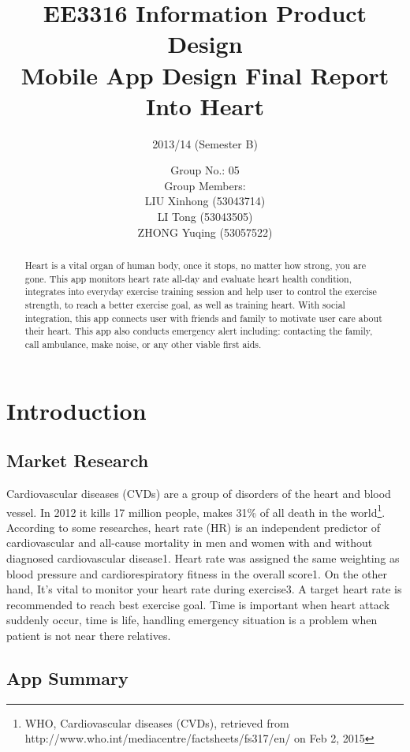 \documentclass[10pt,a4paper,final]{scrartcl}
\author{
Group No.: 05 \\ 
Group Members: \\
LIU Xinhong (53043714) \\
LI Tong (53043505) \\
ZHONG Yuqing (53057522)
}
\title{
EE3316 Information Product Design \\ Mobile App Design Final Report \\ Into Heart}
\subtitle{2013/14 (Semester B)}
\begin{document}
\maketitle

\pagebreak

\begin{abstract}
Heart is a vital organ of human body, once it stops, no matter how strong, you are gone.  
This app monitors heart rate all-day and evaluate heart health condition, integrates into everyday exercise training session and help user to control the exercise strength, to reach a better exercise goal, as well as training heart. With social integration, this app connects user with friends and family to motivate user care about their heart. This app also conducts emergency alert including: contacting the family, call ambulance, make noise, or any other viable first aids. 
\end{abstract}



\tableofcontents

\section{Introduction}

\subsection{Market Research}

Cardiovascular diseases (CVDs) are a group of disorders of the heart and blood vessel. In 2012 it kills 17 million people, makes 31\% of all death in the world\footnote{WHO, Cardiovascular diseases (CVDs), retrieved from http://www.who.int/mediacentre/factsheets/fs317/en/ on Feb 2, 2015 }. 
According to some researches, heart rate (HR) is an independent predictor of cardiovascular and all-cause mortality in men and women with and without diagnosed cardiovascular disease1. Heart rate was assigned the same weighting as blood pressure and cardiorespiratory fitness in the overall score1. On the other hand, It's vital to monitor your heart rate during exercise3. A target heart rate is recommended to reach best exercise goal. Time is important when heart attack suddenly occur, time is life, handling emergency situation is a problem when patient is not near there relatives. 

\subsection{App Summary}
\end{document}
